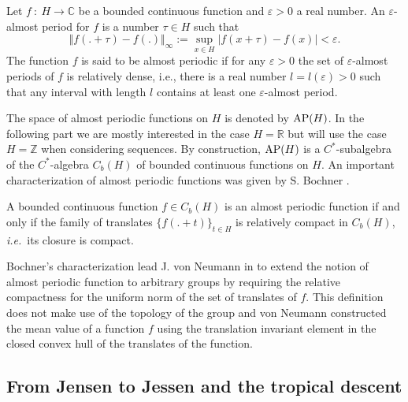 \documentclass[graybox, envcountsect%
]{svmult}
\def\AP{{\rm AP}}
\def\C{{\mathbb C}}
\def\R{{\mathbb R}}
\def\Z{{\mathbb Z}}
\newcommand{\ie}{{\it i.e.\/}\ }
\begin{document}
\begin{definition}\label{defnalmostper} Let  $f~:~H \longrightarrow \C$ be a bounded continuous function and $\varepsilon > 0$ a real number. An $\varepsilon$-almost period for $f$ is a number $\tau \in H$ such that  
$$
\Vert f(.+\tau)-f(.)\Vert_{\infty}:=\displaystyle \sup_{x \in H}|f(x+\tau)-f(x)| < \varepsilon.
$$
The function  $f$  is said to be almost periodic if for any $\varepsilon> 0$ the set of 
$\varepsilon$-almost periods of $f$ is relatively dense, i.e., there is a real number 
$l = l(\varepsilon) > 0$ such that any interval with length $l$ contains at least one $\varepsilon$-almost period. 
\end{definition}
The space of  almost periodic functions on $H$ is denoted by $\AP(H)$. In the following part we are mostly interested in the case $H=\R$ but will use the case $H=\Z$ when considering sequences.\newline
 By construction, $\AP(H)$ is a $C^*$-subalgebra   of the $C^*$-algebra $C_b(H)$ of bounded continuous functions on $H$. An important characterization 
of almost periodic functions was given by S. Bochner \cite{Bochner}. 
\begin{theorem}\label{Bochner} A bounded continuous function $f\in C_b(H)$ is an almost periodic function 
if and only if 
the family of translates $\{f(.+t)\}_{t \in H}$ is relatively compact in $C_b(H)$, \ie its closure is compact. 
\end{theorem}
Bochner's characterization lead J. von Neumann in \cite{vN} to extend the notion of almost periodic function to arbitrary groups by requiring the relative compactness for the uniform norm of the set of translates of  $f$. This definition does not make use of the topology of the group and von Neumann constructed the mean value of a function $f$  using the translation invariant element in the closed convex hull of the translates of the function. 


\subsection{From Jensen to Jessen and the tropical descent}\label{subsec:4.2}
\end{document}
